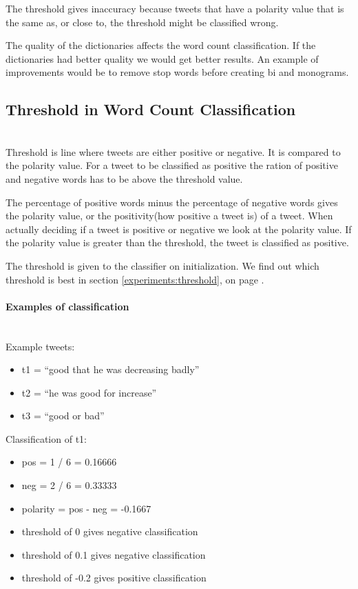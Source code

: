 The threshold gives inaccuracy because tweets that have a polarity value that
is the same as, or close to, the threshold might be classified wrong. 

The quality of the dictionaries affects the word count classification. If the
dictionaries had better quality we would get better results. An example of
improvements would be to remove stop words before creating bi and monograms.

\subsection{Threshold in Word Count Classification}\label{sentiment:threshold} 
\hspace{0pt}\\ 

Threshold is line where tweets are either positive or negative. It is compared
to the polarity value. For a tweet to be classified as positive the ration of
positive and negative words has to be above the threshold value. 

The percentage of positive words minus the percentage of negative words gives
the polarity value, or the positivity(how positive a tweet is) of a tweet. 
When actually deciding if a tweet is positive or negative we look at the
polarity value. If the polarity value is greater than the threshold, the tweet is classified as positive. 

The threshold is given to the classifier on initialization. We find out which
threshold is best in section \ref{experiments:threshold}, on page 
\pageref{experiments:threshold}.

\paragraph{Examples of classification} 
\hspace{0pt}\\ 
Example tweets:
\begin{itemize}
    \item t1 = “good that he was decreasing badly”
    \item t2 = “he was good for increase” 
    \item t3 = “good or bad”
\end{itemize}

Classification of t1:
\begin{itemize}
    \item pos = 1 / 6 = 0.16666
    \item neg = 2 / 6 = 0.33333
    \item polarity = pos - neg = -0.1667
    \item threshold of 0 gives negative classification
    \item threshold of 0.1 gives negative classification
    \item threshold of -0.2 gives positive classification
\end{itemize}

